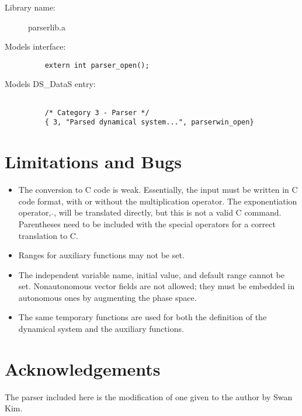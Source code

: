 \begin{description}
\item[Library name:] parserlib.a

\item[Models interface:] \mbox{}
	\begin{verbatim}
	extern int parser_open();
	\end{verbatim}

\item[Models DS\_DataS entry:] \begin{verbatim}

	/* Category 3 - Parser */
	{ 3, "Parsed dynamical system...", parserwin_open}
	\end{verbatim}

\end{description}


\section{Limitations and Bugs}

\begin{itemize}

\item The conversion to C code is weak.  Essentially, the input
must be written in C code format, with or without the multiplication
operator.  The exponentiation operator, $\hat{}$, will be translated directly,
but this is not a valid C command.  Parentheses need to be included with
the special operators for a correct translation to C.

\item Ranges for auxiliary functions may not be set.

\item The independent variable name, initial value, and default
range cannot be set.  Nonautonomous vector fields are not allowed;
they must be embedded in autonomous ones by augmenting the
phase space.

\item The same temporary functions are used for both the definition of the dynamical
system and the auxiliary functions.

\end{itemize}

\section{Acknowledgements}

The parser included here is the modification of one
given to the author by Swan Kim.



